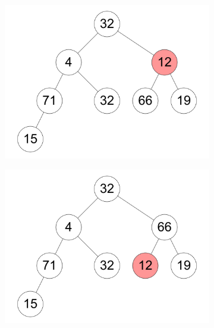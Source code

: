 \documentclass[11pt,a4paper]{article}
\begin{document}
\begin{loesung}
\begin{enumerate}
\begin{figure}[h!]
\begin{subfigure}[b]{0.23\textwidth}
            \end{subfigure}
            \begin{subfigure}[b]{0.23\textwidth}
                \centering
                \includegraphics[width=\textwidth]{img/a3}
            \end{subfigure}
            \begin{subfigure}[b]{0.23\textwidth}
                \centering
                \includegraphics[width=\textwidth]{img/a4}
            \end{subfigure}
            \\
            \begin{subfigure}[b]{0.23\textwidth}
                \centering

\end{subfigure}
\end{figure}
\end{enumerate}
\end{loesung}
\end{document}

